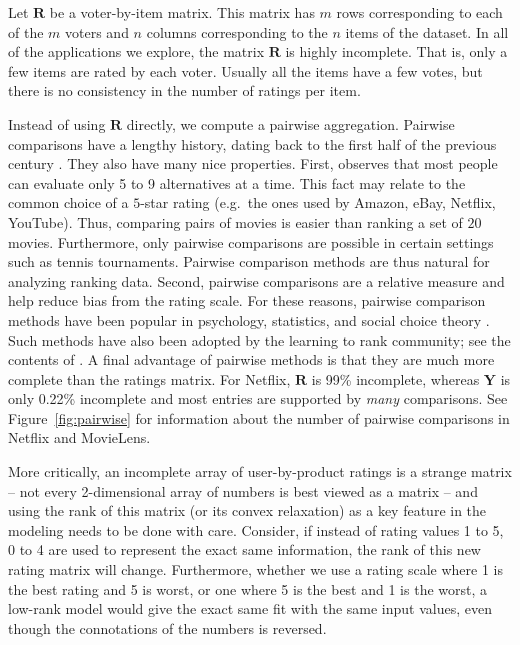 \documentclass{sig-alternate}
\renewcommand{\cite}{\citep}
\newcommand{\mat}{\boldsymbol}
\providecommand{\mR}{\ensuremath{\mat{R}}}
\providecommand{\mY}{\ensuremath{\mat{Y}}}
\begin{document}
Let $\mR$ be a voter-by-item matrix.  This matrix has $m$ rows corresponding
to each of the $m$ voters and $n$ columns corresponding to the $n$ items
of the dataset.  In all of the applications we explore, the matrix 
$\mR$ is highly incomplete.  That is, only a few items are rated by
each voter.  Usually all the items have a few votes, but there is
no consistency in the number of ratings per item.

Instead of using $\mR$ directly, we compute a pairwise aggregation.  
Pairwise comparisons have a lengthy history, dating back to the 
first half of the previous century \cite{Kendall-1940-paired-comparison}.
They also have many nice properties.
First, \citet{miller1956-seven} observes that most people can evaluate only
5 to 9 alternatives at a time.  This fact may relate to the common choice
of a $5$-star rating (e.g.\ the ones used by Amazon, eBay, 
Netflix, YouTube).  Thus, comparing pairs of
movies is easier than ranking a set of $20$ movies.  Furthermore,
only pairwise comparisons are possible in certain settings
such as tennis tournaments. 
Pairwise comparison methods are thus natural for analyzing ranking data.
Second, pairwise comparisons are a relative measure and help reduce 
bias from the rating scale. For these reasons, pairwise
comparison methods have been popular in psychology, statistics, and social
choice theory \cite{david1988-paired,arrow1950-impossibility}. Such
methods have also been adopted by the learning to rank community;
see the contents of \citet{li2008-learning-to-rank}.
A final advantage of pairwise methods is that they are much more complete
than the ratings matrix.  For Netflix, $\mR$ is 99\% incomplete, whereas
$\mY$ is only 0.22\% incomplete and most entries are supported by
\emph{many} comparisons.  See Figure~\ref{fig:pairwise} for information
about the number of pairwise comparisons in Netflix and MovieLens.

More critically, an incomplete array of user-by-product ratings
is a strange matrix -- not every 2-dimensional array of
numbers is best viewed as a matrix --
and using the rank of this matrix (or its convex relaxation) as a key
feature in the modeling needs to be done with care.  Consider,
if instead of rating values 1 to 5, 0 to 4 are used to
represent the exact same information, the rank of this
new rating matrix will change.
Furthermore, whether we use a rating scale where 1 is the best
rating and 5 is worst, or one where 5 is the best
and 1 is the worst, a low-rank model would give the
exact same fit with the same input values, even
though the connotations of the numbers is reversed.
\end{document}
